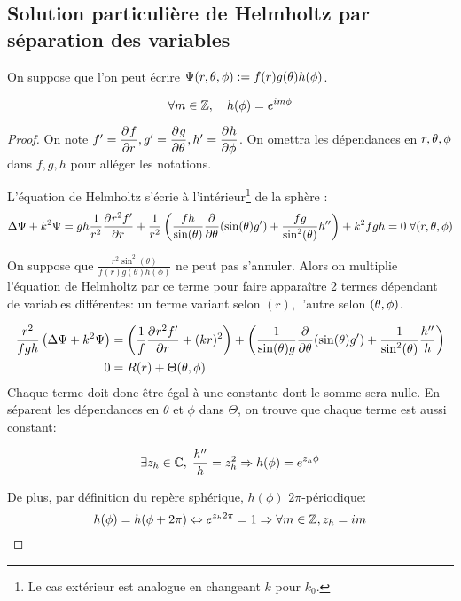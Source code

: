 \subsection{Solution particulière de Helmholtz par séparation des variables}
\begin{hyp}
On suppose que l'on peut écrire \(\Psi(\rtp) : = f(r)g(\theta)h(\phi)\).
\end{hyp}
\begin{prop}
\begin{equation}
\forall m \in \ZZ, \quad h(\phi) = e^{im\phi}
\end{equation}
\end{prop}
\begin{proof}
On note \(f' =\ddr{r}{f}, g' = \ddr{\theta}{g} , h' = \ddr{\phi}{h}\). On omettra les dépendances en \(\rtp\) dans \(f,g,h\) pour alléger les notations.

L'équation de Helmholtz s'écrie à l'intérieur\footnote{Le cas extérieur est analogue en changeant \(k\) pour \(k_0\).} de la sphère :
\begin{equation}\label{eq:helm:helm}
  \Delta \Psi + k^2 \Psi = gh\frac{1}{r^2}\ddr{r}{r^2f'} + \frac{1}{r^2}\left(\frac{fh}{\sin(\theta)}\ddr{\theta}{}(\sin(\theta)g')+\frac{fg}{\sin^2(\theta)}h''\right) + k^2 fgh = 0 \; \forall (r,\tp)
\end{equation}

On suppose que \( \frac{r^2\sin^2(\theta)}{f(r)g(\theta)h(\phi)}\) ne peut pas s'annuler. Alors on multiplie l'équation de Helmholtz par ce terme pour faire apparaître 2 termes dépendant de variables différentes: un terme variant selon \((r)\), l'autre selon \((\tp)\).

\begin{align*}
\frac{r^2}{fgh} \left(\Delta \Psi + k^2 \Psi\right) &=
\left(\frac{1}{f}\ddr{r}{r^2f'} + (kr)^2\right) +
\left(\frac{1}{ \sin(\theta)g} \ddr{\theta}{}(\sin(\theta)g') +  \frac{1}{ \sin^2(\theta)}\frac{h''}{h} \right)\\
0 &=R(r) + \Theta(\tp)
\end{align*}
Chaque terme doit donc être égal à une constante dont le somme sera nulle. En séparent les dépendances en \(\theta\) et \(\phi\) dans \(\Theta\), on trouve que chaque terme est aussi constant:

\[
\exists z_h \in \CC,\; \frac{h''}{h} = z_h^2 \Rightarrow h(\phi) = e^{z_h\phi}
\]

De plus, par définition du repère sphérique, \(h(\phi)\) \(2\pi\)-périodique:
\[
h(\phi) = h(\phi + 2\pi) \Leftrightarrow e^{z_h2\pi}= 1 \Rightarrow \forall m \in \ZZ, z_h = im
\]
\end{proof}

